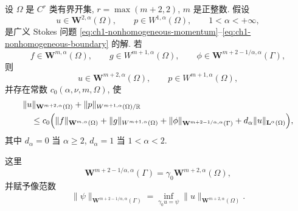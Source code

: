 \begin{Proposition}
\label{prop:ch1-stokes-regularity-apriori}
设 $\Omega$ 是 $C^r$ 类有界开集, $r=\max(m+2,2)$, $m$ 是正整数. 假设
\begin{equation}
u\in\mathbf W^{2,\alpha}(\Omega),\qquad
p\in W^{1,\alpha}(\Omega),\qquad 1<\alpha<+\infty,
\label{eq:ch1-stokes-regularity-assumption}
\end{equation}
是广义 Stokes 问题 \eqref{eq:ch1-nonhomogeneous-momentum}--\eqref{eq:ch1-nonhomogeneous-boundary} 的解. 若
\[
f\in\mathbf W^{m,\alpha}(\Omega),\qquad
g\in W^{m+1,\alpha}(\Omega),\qquad
\phi\in\mathbf W^{m+2-1/\alpha,\alpha}(\Gamma),
\]
则
\begin{equation}
u\in\mathbf W^{m+2,\alpha}(\Omega),\qquad
p\in W^{m+1,\alpha}(\Omega),
\label{eq:ch1-stokes-regularity-conclusion}
\end{equation}
并存在常数 $c_0(\alpha,\nu,m,\Omega)$, 使
\begin{equation}
\begin{aligned}
&\lVert u\rVert_{\mathbf W^{m+2,\alpha}(\Omega)}
+\lVert p\rVert_{W^{m+1,\alpha}(\Omega)/\mathbb R}\\
&\quad\leq c_0\Bigl(
\lVert f\rVert_{\mathbf W^{m,\alpha}(\Omega)}
+\lVert g\rVert_{W^{m+1,\alpha}(\Omega)}
+\lVert\phi\rVert_{\mathbf W^{m+2-1/\alpha,\alpha}(\Gamma)}
+d_\alpha\lVert u\rVert_{\mathbf L^\alpha(\Omega)}\Bigr),
\end{aligned}
\label{eq:ch1-stokes-regularity-estimate}
\end{equation}
其中 $d_\alpha=0$ 当 $\alpha\geq2$, $d_\alpha=1$ 当 $1<\alpha<2$.
\end{Proposition}

这里
\[
\mathbf W^{m+2-1/\alpha,\alpha}(\Gamma)
=\gamma_0\mathbf W^{m+2,\alpha}(\Omega),
\]
并赋予像范数
\[
\lVert\psi\rVert_{\mathbf W^{m+2-1/\alpha,\alpha}(\Gamma)}
=\inf_{\gamma_0u=\psi}\lVert u\rVert_{\mathbf W^{m+2,\alpha}(\Omega)}.
\]

